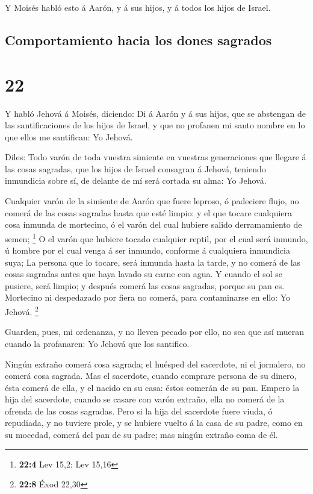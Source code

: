  Y Moisés habló esto á Aarón, y á sus hijos, y á todos
los hijos de Israel.

\hypertarget{comportamiento-hacia-los-dones-sagrados}{%
\subsection{Comportamiento hacia los dones
sagrados}\label{comportamiento-hacia-los-dones-sagrados}}

\hypertarget{section-21}{%
\section{22}\label{section-21}}

 Y habló Jehová á Moisés, diciendo:  Di á
Aarón y á sus hijos, que se abstengan de las santificaciones de los
hijos de Israel, y que no profanen mi santo nombre en lo que ellos me
santifican: Yo Jehová.

 Diles: Todo varón de toda vuestra simiente en vuestras
generaciones que llegare á las cosas sagradas, que los hijos de Israel
consagran á Jehová, teniendo inmundicia sobre sí, de delante de mí será
cortada su alma: Yo Jehová.

 Cualquier varón de la simiente de Aarón que fuere
leproso, ó padeciere flujo, no comerá de las cosas sagradas hasta que
esté limpio: y el que tocare cualquiera cosa inmunda de mortecino, ó el
varón del cual hubiere salido derramamiento de semen; \footnote{\textbf{22:4}
  Lev 15,2; Lev 15,16}  O el varón que hubiere tocado
cualquier reptil, por el cual será inmundo, ú hombre por el cual venga á
ser inmundo, conforme á cualquiera inmundicia suya;  La
persona que lo tocare, será inmunda hasta la tarde, y no comerá de las
cosas sagradas antes que haya lavado su carne con agua.  Y
cuando el sol se pusiere, será limpio; y después comerá las cosas
sagradas, porque su pan es.  Mortecino ni despedazado por
fiera no comerá, para contaminarse en ello: Yo Jehová. \footnote{\textbf{22:8}
  Éxod 22,30}

 Guarden, pues, mi ordenanza, y no lleven pecado por ello,
no sea que así mueran cuando la profanaren: Yo Jehová que los santifico.

 Ningún extraño comerá cosa sagrada; el huésped del
sacerdote, ni el jornalero, no comerá cosa sagrada.  Mas
el sacerdote, cuando comprare persona de su dinero, ésta comerá de ella,
y el nacido en su casa: éstos comerán de su pan.  Empero
la hija del sacerdote, cuando se casare con varón extraño, ella no
comerá de la ofrenda de las cosas sagradas.  Pero si la
hija del sacerdote fuere viuda, ó repudiada, y no tuviere prole, y se
hubiere vuelto á la casa de su padre, como en su mocedad, comerá del pan
de su padre; mas ningún extraño coma de él.

